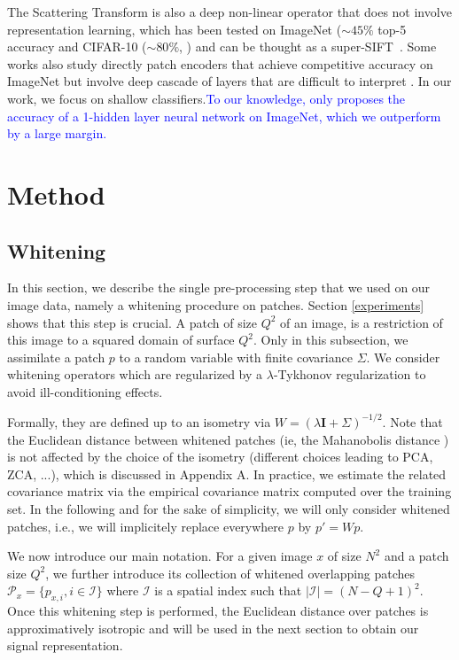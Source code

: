 \documentclass{article}
\newcommand{\Edouard}[1]{\textcolor{blue}{#1}}
\begin{document}
{The Scattering Transform \citep{mallat2012group} is also a deep non-linear operator that does not involve representation learning, which has been tested on ImageNet ($\sim 45\%$ top-5 accuracy \citep{zarka2019deep} and  CIFAR-10 ($\sim 80 \%$, \citep{Oyallon_2015_CVPR}) and can be thought as a super-SIFT~\citep{Oyallon_2018_ECCV}.
Some works also study directly patch encoders that achieve competitive accuracy on ImageNet but involve deep cascade of layers that are difficult to interpret \citep{oyallon2017scaling,zarka2019deep,brendel2019approximating}. In our work, we focus on shallow classifiers.\Edouard{To our knowledge, only \cite{greedy} proposes the accuracy of a 1-hidden layer neural network on ImageNet, which we outperform by a large margin.}

\section{Method}
\label{method}

\subsection{Whitening}

In this section, we describe the single pre-processing step that we used on our image data, namely a whitening procedure on patches. Section \ref{experiments} shows that this step is crucial. A patch of size $Q^2$ of an image, is a  restriction of this image to a squared domain of surface $Q^2$. Only in this subsection, we assimilate a patch $p$ to a random variable with finite covariance $\Sigma$. We consider whitening operators which are regularized by a $\lambda$-Tykhonov regularization to avoid ill-conditioning effects.

Formally, they are defined up to an isometry via $W=(\lambda \mathbf{I}+\Sigma
)^{-1/2}$.  Note that the Euclidean distance between whitened patches (ie, the Mahanobolis distance \citep{chandra1936generalised, mclachlan1999mahalanobis} ) is not affected by the choice of the isometry (different choices leading to PCA, ZCA, ...), which is discussed in Appendix A. In practice, we estimate the related covariance matrix via the empirical covariance matrix  computed over the training set. In the following and for the sake of simplicity, we will only  consider whitened patches, i.e., we will implicitely replace everywhere $p$ by $p'=Wp$.
 
 
We now introduce our main notation. For a given image $x$ of size $N^2$ and a patch size $Q^2$, we further introduce its collection of whitened overlapping patches $\mathcal{P}_x=\{p_{x,i},i\in\mathcal{I}\}$ where $\mathcal{I}$ is a spatial index such that $|\mathcal{I}|=(N-Q+1)
^2$.
Once this whitening step is performed, the Euclidean distance over patches is approximatively isotropic and will be used in the next section to obtain our signal representation.

}
\end{document}
